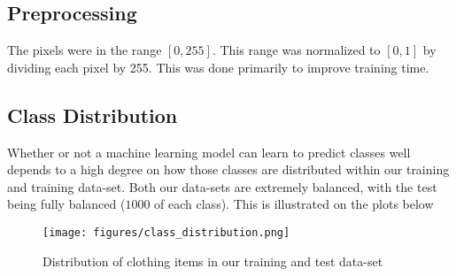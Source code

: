 \subsection{Preprocessing}
The pixels were in the range $[0, 255]$. This range was normalized to $[0, 1]$ by dividing each pixel by 255. This was done primarily to improve training time. %

\subsection{Class Distribution}
Whether or not a machine learning model can learn to predict classes well depends to a high degree on how those classes are distributed within our training and training data-set. Both our data-sets are extremely balanced, with the test being fully balanced ($1000$ of each class). This is illustrated on the plots below

\begin{figure}[ht]
\centering
\texttt{[image: figures/class\_distribution.png]}
\captionsetup{justification=centering,margin=2cm}
\caption{Distribution of clothing items in our training and test data-set}
\end{figure}

